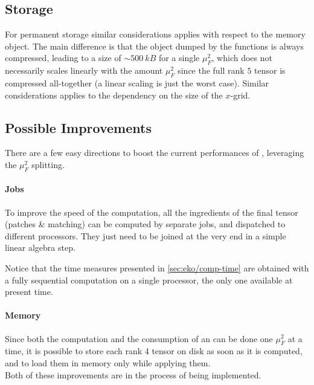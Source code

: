 \subsection{Storage}
\label{sec:eko/storage}

For permanent storage similar considerations applies with respect to the
memory object.
The main difference is that the object dumped by the \eko{} functions is always
compressed, leading to a size of $\sim \SI{500}{kB}$ for a single $\mu_F^2$,
which does not necessarily scales linearly with the amount $\mu_F^2$ since the
full rank $5$ tensor is compressed all-together (a linear scaling is just
the worst case).
Similar considerations applies to the dependency on the size of the $x$-grid.

\subsection{Possible Improvements}

There are a few easy directions to boost the current performances
of \eko{}, leveraging the $\mu_F^2$ splitting.

\paragraph{Jobs} To improve the speed of the computation, all the ingredients
of the final tensor (patches \& matching) can be computed by separate jobs, and
dispatched to different processors.
They just need to be joined at the very end in a simple linear algebra step.

Notice that the time measures presented in \cref{sec:eko/comp-time} are
obtained with a fully sequential computation on a single processor, the only
one available at present time.

\paragraph{Memory} Since both the computation and the consumption of an \eko{}
can be done one $\mu_F^2$ at a time, it is possible to store each rank 4 tensor
on disk as soon as it is computed, and to load them in memory only while
applying them.\\

Both of these improvements are in the process of being implemented.
